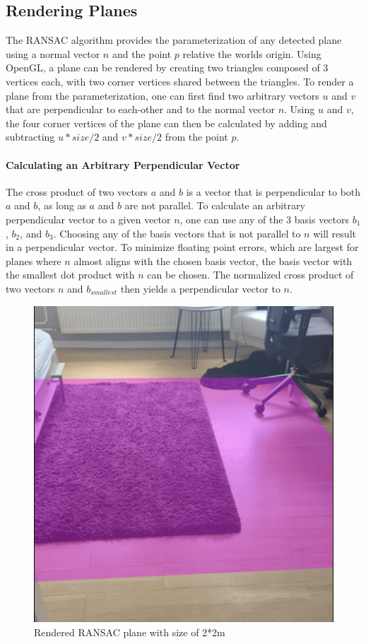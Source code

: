 \subsection{Rendering Planes}\label{subsec:rendering-planes}
The RANSAC algorithm provides the parameterization of any detected plane using a normal vector $n$ and the point $p$ relative the worlds origin.
Using OpenGL, a plane can be rendered by creating two triangles composed of 3 vertices each, with two corner vertices shared between the triangles.
To render a plane from the parameterization, one can first find two arbitrary vectors $u$ and $v$
that are perpendicular to each-other and to the normal vector $n$.
Using $u$ and $v$, the four corner vertices of the plane can then be calculated by adding and subtracting $u * size / 2$ and $v * size / 2$ from the point $p$.

\paragraph{Calculating an Arbitrary Perpendicular Vector}
The cross product of two vectors $a$ and $b$ is a vector that is perpendicular to both $a$ and $b$,
as long as $a$ and $b$ are not parallel.
To calculate an arbitrary perpendicular vector to a given vector $n$, one can use any of the 3 basis vectors ${b_1}$, ${b_2}$, and ${b_3}$.
Choosing any of the basis vectors that is not parallel to $n$ will result in a perpendicular vector.
To minimize floating point errors, which are largest for planes where $n$ almost aligns with the chosen basis vector,
the basis vector with the smallest dot product with $n$ can be chosen.
The normalized cross product of two vectors $n$ and $b_{smallest}$ then yields a perpendicular vector to $n$.

\begin{figure}[ht!]
    \centering
    \includegraphics[width=0.5\linewidth]{images/renderedPlane}
    \caption{Rendered RANSAC plane with size of 2*2m}
\end{figure}

